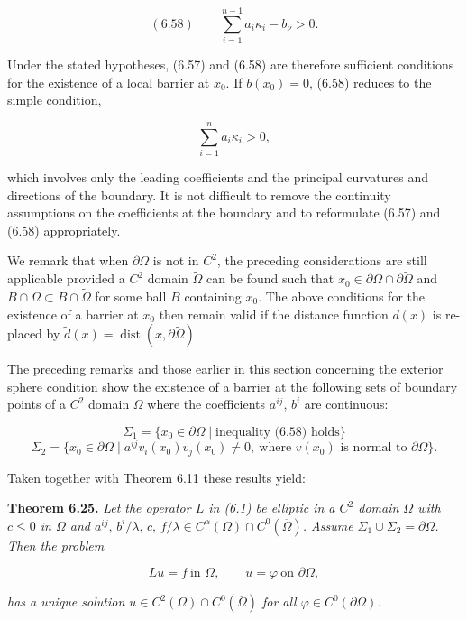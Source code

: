 \[
(6.58) \qquad \sum_{i=1}^{n-1} a_i\kappa_i - b_\nu > 0.
\]


Under the stated hypotheses, (6.57) and (6.58) are therefore sufficient conditions
for the existence of a local barrier at $x_0$. If $b(x_0)=0$, (6.58) reduces to the simple
condition,

\[
\sum_{i=1}^{n} a_i \kappa_i > 0,
\]

which involves only the leading coefficients and the principal curvatures and
directions of the boundary. It is not difficult to remove the continuity assumptions
on the coefficients at the boundary and to reformulate (6.57) and (6.58)
appropriately.

We remark that when $\partial\Omega$ is not in $C^2$, the preceding considerations are still
applicable provided a $C^2$ domain $\widetilde{\Omega}$ can be found such that $x_0 \in \partial\Omega \cap \partial\widetilde{\Omega}$ and
$B \cap \Omega \subset B \cap \widetilde{\Omega}$ for some ball $B$ containing $x_0$. The above conditions for the
existence of a barrier at $x_0$ then remain valid if the distance function $d(x)$ is re-
placed by $\widetilde{d}(x)=\operatorname{dist}(x,\partial\widetilde{\Omega})$.

The preceding remarks and those earlier in this section concerning the exterior
sphere condition show the existence of a barrier at the following sets of boundary
points of a $C^2$ domain $\Omega$ where the coefficients $a^{ij},\, b^i$ are continuous:

\[
\Sigma_1 = \{x_0 \in \partial\Omega \mid \text{inequality (6.58) holds}\}
\]
\[
\Sigma_2 = \{x_0 \in \partial\Omega \mid a^{ij}v_i(x_0)v_j(x_0)\neq 0,\ \text{where } v(x_0)\text{ is normal to }\partial\Omega\}.
\]

Taken together with Theorem 6.11 these results yield:

\textbf{Theorem 6.25.} \emph{Let the operator $L$ in (6.1) be elliptic in a $C^2$ domain $\Omega$ with $c \leq 0$ in
$\Omega$ and $a^{ij},\, b^i/\lambda,\, c,\, f/\lambda \in C^\alpha(\Omega)\cap C^0(\overline{\Omega})$. Assume $\Sigma_1 \cup \Sigma_2 = \partial\Omega$. Then the problem}

\[
Lu=f\ \text{in }\Omega,\qquad u=\varphi\ \text{on }\partial\Omega,
\]

\emph{has a unique solution $u\in C^2(\Omega)\cap C^0(\overline{\Omega})$ for all $\varphi\in C^0(\partial\Omega)$.}

